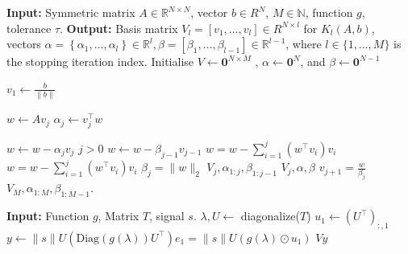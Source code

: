 \documentclass[11pt]{article}
\renewcommand{\mathbb}[1]{\mathds{#1}}
\newcommand{\R}{\mathbb{R}}
\newcommand{\N}{\mathbb{N}}
\renewcommand{\L}{\mathcal{L}}
\theoremstyle{definition}
\theoremstyle{remark}
\theoremstyle{experimental}
\begin{document}
\begin{algorithm}[ht!]
  \caption{Modified Lanczos method in floating point arithmetic.}
  \label{alg:lanczos}
  \begin{algorithmic}[1]
    \State \textbf{Input:} Symmetric matrix $ A \in \R^{N\times N}$, vector $ b \in R^N $, $ M \in
    \N $, function $ g $, tolerance $ \tau $.
    \State \textbf{Output: } Basis matrix $ V_l = \left[ v_1,\dots,v_l \right] \in R^{N \times l} $ for $ K_l(A,b) $, vectors $
    \alpha =\left\{ \alpha_1,\dots,\alpha_l \right\} \in \R^l, \beta=\left[ \beta_1,\dots,\beta_{l-1} \right] \in \R^{l-1} $, where $ l \in
    \{ 1,\dots,M \}$ is the stopping iteration index.
    \State Initialise $ V \leftarrow \mathbf{0}^{N \times M} $ , $ \alpha \leftarrow \mathbf{0}^N $,
    and $ \beta \leftarrow \mathbf{0}^{N-1}$

    \State $ v_1 \leftarrow \frac{b}{\|b\|} $

    \State $ w \leftarrow Av_j  $
    \State $ \alpha_j \leftarrow v_j^{\top} w $

        \State $w \leftarrow w - \alpha_j v_j$
        \State {} $j>0$  $w \leftarrow w - \beta_{j-1} v_{j-1}$
    \State $w = w - \sum_{i=1}^j (w^{\top}v_i)v_i $
    \State $w = w - \sum_{i=1}^j (w^{\top}v_i)v_i $
    \EndIf
    \State $ \beta_j = \|w\|_2 $
      \State 
      \Return $ V_j, \alpha_{1:j}, \beta_{1:j-1} $
    \Else
      \State 
      \Return $ V_j, \alpha, \beta $
      \EndIf
      \State $ v_{j+1} = \frac{w}{\beta_j} $
    \EndIf
    \EndFor
    \State \Return $ V_M, \alpha_{1:M}, \beta_{1:M-1} $.
  \end{algorithmic}
  
\end{algorithm}

\begin{algorithm}[ht!]
  \caption{Approximation of $ g(\L)s $ using Lanczos.}
  \label{alg:g_evaluation}
  \begin{algorithmic}[1]
    \State \textbf{Input:} Function $ g $, Matrix $ T $, signal $ s $.
    \State $ \lambda, U \leftarrow $ diagonalize($ T $)  
    \State $ u_1 \leftarrow  (U^{\top})_{:,1}$
    \State $y \leftarrow \|s\| U (\text{Diag}(g(\lambda)) U^{\top})e_1 = \|s\| U (g(\lambda) \odot u_1)$
    \State {}
    \State \Return $ Vy $
  \end{algorithmic}
\end{algorithm}
\end{document}

